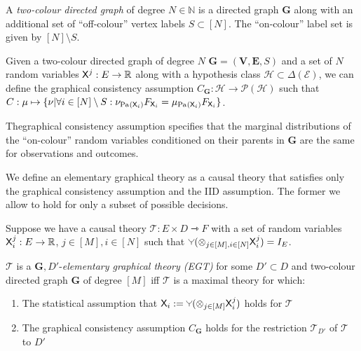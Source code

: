 \begin{definition}\label{def:tc_graph}
A \emph{two-colour directed graph} of degree $N\in\mathbb{N}$ is a directed graph $\mathbf{G}$ along with an additional set of ``off-colour'' vertex labels $S\subset [N]$. The ``on-colour'' label set is given by $[N]\setminus S$.
\end{definition}

\begin{definition}
Given a two-colour directed graph of degree $N$ $\mathbf{G}=(\mathbf{V},\mathbf{E},S)$ and a set of $N$ random variables $\mathsf{X}^j:E\to \mathbb{R}$ along with a hypothesis class $\mathscr{H}\subset\Delta(\mathcal{E})$, we can define the graphical consistency assumption $C_{\mathbf{G}}:\mathscr{H}\to \mathscr{P}(\mathscr{H})$ such that $C:\mu\mapsto \{\nu|\forall i\in [N]\setminus S:\nu_{\text{Pa}_{}(\mathsf{X}_i)}F_{\mathsf{X}_i} = \mu_{\text{Pa}_{}(\mathsf{X}_i)}F_{\mathsf{X}_i}\}$.

Thegraphical consistency assumption specifies that the marginal distributions of the ``on-colour'' random variables conditioned on their parents in $\mathbf{G}$ are the same for observations and outcomes.
\end{definition}

We define an elementary graphical theory as a causal theory that satisfies only the graphical consistency assumption and the IID assumption. The former we allow to hold for only a subset of possible decisions.

\begin{definition}\label{def:EGT}
Suppose we have a causal theory $\mathscr{T}: E\times D\rightarrowtriangle F$ with a set of random variables $\mathsf{X}^j_i:E\to \mathbb{R}$, $j\in [M],i\in [N]$ such that $\splitter{0.1}(\otimes_{j\in [M],i\in[N]} \RV{X}^j_i)=I_E$.

$\mathscr{T}$ is a $\mathbf{G},D'$-\emph{elementary graphical theory (EGT)} for some $D'\subset D$ and two-colour directed graph $\mathbf{G}$ of degree $[M]$ iff $\mathscr{T}$ is a maximal theory for which:
\begin{enumerate}
    \item The statistical assumption that $\RV{X}_i:= \splitter{0.1}(\otimes_{j\in [M]} \RV{X}^j_i)$ holds for $\mathscr{T}$
    \item The graphical consistency assumption $C_{\mathbf{G}}$ holds for the restriction $\mathscr{T}_{D'}$ of $\mathscr{T}$ to $D'$
\end{enumerate}
\end{definition}

